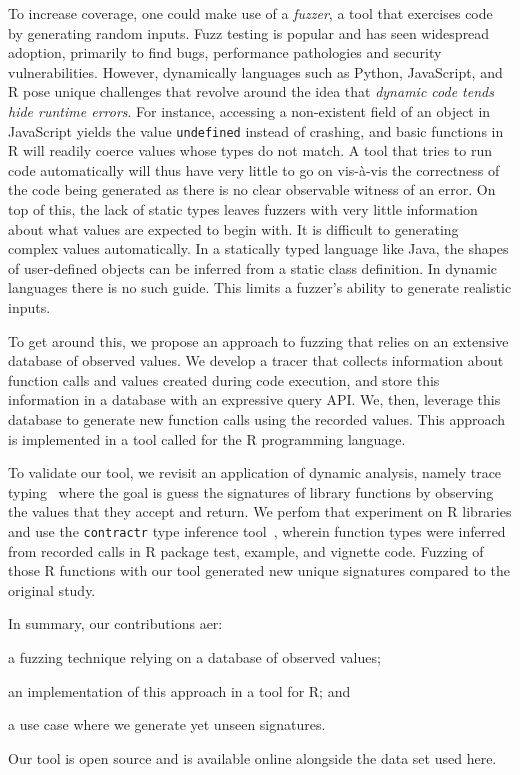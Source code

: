 \documentclass[sigplan,nonacm,anonymous,review]{acmart}
\begin{document}
To increase coverage, one could make use of a \textit{fuzzer}, a tool
that exercises code by generating random inputs.  Fuzz testing is
popular and has seen widespread adoption, primarily to find bugs,
performance pathologies and security vulnerabilities.  However,
dynamically languages such as Python, JavaScript, and R pose unique
challenges that revolve around the idea that \textit{dynamic code
  tends hide runtime errors}.  For instance, accessing a non-existent
field of an object in JavaScript yields the value {\tt undefined}
instead of crashing, and basic functions in R will readily coerce
values whose types do not match.  A tool that tries to run code
automatically will thus have very little to go on vis-\`a-vis the
correctness of the code being generated as there is no clear
observable witness of an error. On top of this, the lack of static
types leaves fuzzers with very little information about what values
are expected to begin with.  It is difficult to generating complex
values automatically.  In a statically typed language like Java, the
shapes of user-defined objects can be inferred from a static class
definition. In dynamic languages there is no such guide.  This limits
a fuzzer's ability to generate realistic inputs.

To get around this, we propose an approach to fuzzing that relies on
an extensive database of observed values.  We develop a tracer that
collects information about function calls and values created during
code execution, and store this information in a database with an
expressive query API.  We, then, leverage this database to generate
new function calls using the recorded values.  This approach is
implemented in a tool called \tool for the R programming language.

To validate our tool, we revisit an application of dynamic analysis,
namely trace typing~\cite{andreasen2016trace} where the goal is guess
the signatures of library functions by observing the values that they
accept and return. We perfom that experiment on R libraries and use
the {\tt contractr} type inference tool~\cite{turcotte2020designing},
wherein function types were inferred from recorded calls in R package
test, example, and vignette code.  Fuzzing \UFNumFunctions of those R
functions with our tool generated \UFSignatrSignaturesRnd new unique
signatures compared to the original study.

In summary, our contributions aer:
\begin{inparaenum}[(1)]
\item a fuzzing technique relying on a database of observed values;
\item an implementation of this approach in a tool for R; and
\item a use case where we generate yet unseen signatures.
\end{inparaenum} 
Our tool is open source and is available online alongside the data set
used here.
\end{document}
